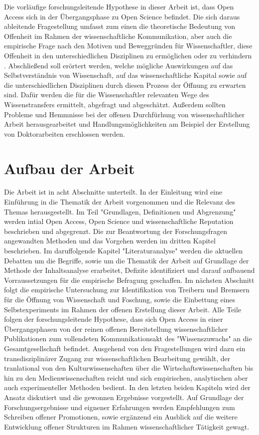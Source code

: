 Die vorläufige forschungsleitende Hypothese in dieser Arbeit ist, dass Open Access sich in der Übergangsphase zu Open Science befindet. Die sich daraus ableitende Fragestellung umfasst zum einen die theoretische Bedeutung von Offenheit im Rahmen der wissenschaftliche Kommunikation, aber auch die empirische Frage nach den Motiven und Beweggründen für Wissenschaftler, diese Offenheit in den unterschiedlichen Disziplinen zu ermöglichen oder zu verhindern . Abschließend soll erörtert werden, welche mögliche Auswirkungen auf das Selbstverständnis von Wissenschaft, auf das wissenschaftliche Kapital sowie auf die unterschiedlichen Disziplinen durch diesen Prozess der Öffnung zu erwarten sind. Dafür werden die für die Wissenschaftler relevanten Wege des Wissenstransfers ermittelt, abgefragt und abgeschätzt. Außerdem sollten Probleme und Hemmnisse bei der offenen Durchfürhung von wissenschaftlicher Arbeit herausgearbeitet und Handlungsmöglichkeiten am Beispiel der Erstellung von Doktorarbeiten erschlossen werden.

\section{Aufbau der Arbeit} 

Die Arbeit ist in acht Abschnitte unterteilt. In der Einleitung wird eine Einführung in die Thematik der Arbeit vorgenommen und die Relevanz des Themas herausgestellt. Im Teil "Grundlagen, Definitionen und Abgrenzung" werden intial Open Access, Open Science und wissenschaftliche Reputation beschrieben und abgegrenzt. Die zur Beantwortung der Forschungsfragen angewandten Methoden und das Vorgehen werden im dritten Kapitel beschrieben. Im daruffolgende Kapitel "Literaturanalyse" werden die aktuellen Debatten um die Begriffe, sowie um die Thematik der Arbeit auf Grundlage der Methode der Inhaltsanalyse erarbeitet, Defizite identifiziert und darauf aufbauend Vorraussetzungen für die empirische Befragung geschaffen. Im nächsten Abschnitt folgt die empirische Untersuchung zur Identifikation von Treibern und Bremsern für die Öffnung von Wissenschaft und Foschung, sowie die Einbettung eines Selbstexperiments im Rahmen der offenen Erstellung dieser Arbeit. Alle Teile folgen der forschungsleitende Hypothese, dass sich Open Access in einer Übergangsphasen von der reinen offenen Bereitstellung wissenschaftlicher Publikationen zum vollendeten Kommunikationsakt des "Wissenszuwachs" \cite{Luhmann1998} an die Gesamtgesellschaft befindet. Ausgehend von den Fragestellungen wird dazu ein transdisziplinärer Zugang zur wissenschaftlichen Bearbeitung gewählt, der tranlational von den Kulturwissenschaften über die Wirtschaftswissenschaften bis hin zu den Medienwissenschaften reicht und sich empirischen, analytischen aber auch experimenteller Methoden bedient. In den letzten beiden Kapiteln wird der Ansatz diskutiert und die gewonnen Ergebnisse vorgestellt. Auf Grundlage der Forschungsergebnisse und eignener Erfahrungen werden Empfehlungen zum Schreiben offener Promotionen, sowie ergänzend ein Ausblick auf die weitere Entwicklung offener Strukturen im Rahmen wissenschaftlicher Tätigkeit gewagt.
